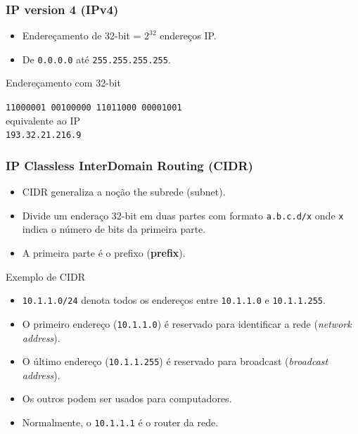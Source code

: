 \documentclass[xcolor=dvipsnames,10pt,compress,aspectratio=169]{beamer}
\begin{document}
\begin{frame}[fragile]
  \frametitle{IP version 4 (IPv4)}
  \begin{itemize}
  \item Endereçamento de 32-bit = $2^{32}$ endereços IP.
  \item De \verb+0.0.0.0+ até \verb+255.255.255.255+.
  \end{itemize}
  \begin{block}{Endereçamento com 32-bit}
  \begin{center}
    \verb+11000001 00100000 11011000 00001001+\\
    equivalente ao IP \\
    \verb+193.32.21.216.9+
  \end{center}
  \end{block}
\end{frame}

\begin{frame}[fragile]
  \frametitle{IP Classless InterDomain Routing (CIDR)}
  \begin{itemize}
  \item CIDR generaliza a noção the subrede (subnet).
  \item Divide um enderaço 32-bit em duas partes com formato \verb+a.b.c.d/x+ onde \verb+x+
    indica o número de bits da primeira parte.
  \item A primeira parte é o prefixo (\textbf{prefix}).
  \end{itemize}
  \begin{exampleblock}{Exemplo de CIDR}
    \begin{itemize}
    \item \verb+10.1.1.0/24+ denota todos os endereços entre \verb+10.1.1.0+ e
      \verb+10.1.1.255+.
    \item O primeiro endereço (\verb+10.1.1.0+) é reservado para  identificar a rede (\emph{network address}).
    \item O último endereço (\verb+10.1.1.255+) é reservado para broadcast (\emph{broadcast address}).
    \item Os outros podem ser usados para computadores.
    \item Normalmente, o \verb+10.1.1.1+ é o router da rede.
    \end{itemize}
  \end{exampleblock}
\end{frame}
\end{document}
